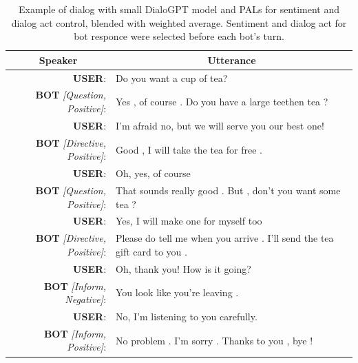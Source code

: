 \documentclass[11pt]{article}
\begin{document}
\begin{table}[]
\begin{tabular}{rl}
\multicolumn{1}{c}{Speaker}    & \multicolumn{1}{c}{Utterance}                                            \\ \hline
\textbf{USER}:                          & Do you want a cup of tea?                                                \\
\textbf{BOT} \textit{{[}Question, Positive{]}}:  & Yes , of course . Do you have a large teethen tea ?                      \\
\textbf{USER}:                          & I'm afraid no, but we will serve you our best one!                       \\
\textbf{BOT} \textit{{[}Directive, Positive{]}}: & Good , I will take the tea for free .                                    \\
\textbf{USER}:                          & Oh, yes, of course                                                       \\
\textbf{BOT} \textit{{[}Question, Positive{]}}:  & That sounds really good . But , don't you want some tea ?                \\
\textbf{USER}:                          & Yes, I will make one for myself too                                      \\
\textbf{BOT} \textit{{[}Directive, Positive{]}}: & Please do tell me when you arrive . I'll send the tea gift card to you . \\
\textbf{USER}:                          & Oh, thank you! How is it going?                                          \\
\textbf{BOT} \textit{{[}Inform, Negative{]}}:    & You look like you're leaving .                                           \\
\textbf{USER}:                          & No, I'm listening to you carefully.                                      \\
\textbf{BOT} \textit{{[}Inform, Positive{]}}:    & No problem . I'm sorry . Thanks to you , bye !                          
\end{tabular}
\caption{Example of dialog with small DialoGPT model and PALs for sentiment and dialog act control, blended with weighted average. Sentiment and dialog act for bot responce were selected before each bot's turn.}
\label{tab:tea_example_dialog}
\end{table}
\end{document}
